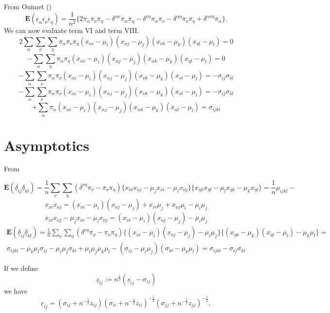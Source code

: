 \documentclass[
  12pt,
  letterpaper,
  DIV=11,
  numbers=noendperiod]{scrartcl}
\newcommand{\ul}[1]{\underline{#1}}
\begin{document}
From Ouimet ()
\[\mathbf{E}(\ul{\epsilon}_\alpha\ul{\epsilon}_\nu\ul{\epsilon}_\eta)=\frac{1}{n^2}
\{2\pi_\alpha\pi_\nu\pi_\eta
-\delta^{\alpha\nu}\pi_\alpha\pi_\eta
-\delta^{\nu\eta}\pi_\alpha\pi_\nu
-\delta^{\alpha\eta}\pi_\nu\pi_\eta
+\delta^{\alpha\nu\eta}\pi_\alpha\}.
\] We can now evaluate term VI and term VIII. \[
2\sum_\alpha\sum_\nu\sum_\eta\pi_\alpha\pi_\nu\pi_\eta
(x_{\alpha i}-\mu_i)(x_{\alpha j}-\mu_j)(x_{\nu k}-\mu_k)(x_{\eta l}-\mu_l)=0
\] \[
-\sum_\alpha\sum_\eta\pi_\alpha\pi_\eta(x_{\alpha i}-\mu_i)(x_{\alpha j}-\mu_j)(x_{\alpha k}-\mu_k)(x_{\eta l}-\mu_l)=0
\] \[
-\sum_\alpha\sum_\nu
\pi_\alpha\pi_\nu
(x_{\alpha i}-\mu_i)(x_{\alpha j}-\mu_j)(x_{\nu k}-\mu_k)(x_{\nu l}-\mu_l)=-\sigma_{ij}\sigma_{kl}
\] \[
-\sum_\alpha\sum_\nu
\pi_\alpha\pi_\nu(x_{\alpha i}-\mu_i)(x_{\alpha j}-\mu_j)(x_{\nu k}-\mu_k)(x_{\nu l}-\mu_l)=-\sigma_{ij}\sigma_{kl}
\] \[
+\sum_\alpha
\pi_\alpha(x_{\alpha i}-\mu_i)(x_{\alpha j}-\mu_j)(x_{\alpha k}-\mu_k)(x_{\alpha l}-\mu_l)=\sigma_{ijkl}
\]

\section{Asymptotics}\label{asymptotics}

From

\[
\mathbf{E}(\ul{\delta}_{ij}\ul{\delta}_{kl})=\frac{1}{n}\sum_\nu\sum_\eta(\delta^{\nu\eta}\pi_\nu-\pi_\nu\pi_\eta)
\{x_{\nu i}x_{\nu j}
-\mu_jx_{\nu i}-\mu_ix_{\nu j}\}\{x_{\eta k}x_{\eta l}
-\mu_lx_{\eta k}-\mu_kx_{\eta l}\}=\frac{1}{n}\mu_{ijkl}-
\] \[
x_{\nu i}x_{\nu j}=(x_{\nu i}-\mu_i)(x_{\nu j}-\mu_j)+x_{\nu i}\mu_j+x_{\nu j}\mu_i-\mu_i\mu_j
\] \[x_{\nu i}x_{\nu j}
-\mu_jx_{\nu i}-\mu_ix_{\nu j}=(x_{\nu i}-\mu_i)(x_{\nu j}-\mu_j)-\mu_i\mu_j
\] \begin{multline}
\mathbf{E}(\ul{\delta}_{ij}\ul{\delta}_{kl})=\frac{1}{n}\sum_\nu\sum_\eta(\delta^{\nu\eta}\pi_\nu-\pi_\nu\pi_\eta)
\{(x_{\nu i}-\mu_i)(x_{\nu j}-\mu_j)-\mu_i\mu_j\}\{(x_{\eta k}-\mu_k)(x_{\eta l}-\mu_l)-\mu_k\mu_l\}=\\
\sigma_{ijkl}-\mu_k\mu_l\sigma_{ij}-\mu_i\mu_j\sigma_{kl}+\mu_i\mu_j\mu_k\mu_l-(\sigma_{ij}-\mu_i\mu_j)(\sigma_{kl}-\mu_k\mu_l)=\sigma_{ijkl}-\sigma_{ij}\sigma_{kl}
\end{multline}

If we define \[
\ul{z}_{ij}:=n^\frac12(\ul{s}_{ij}-\sigma_{ij})
\] we have \[
\ul{r}_{ij}=(\sigma_{ij}+n^{-\frac12}z_{ij})(\sigma_{ii}+n^{-\frac12}z_{ii})^{-\frac12}(\sigma_{jj}+n^{-\frac12}z_{jj})^{-\frac12},
\]
\end{document}

